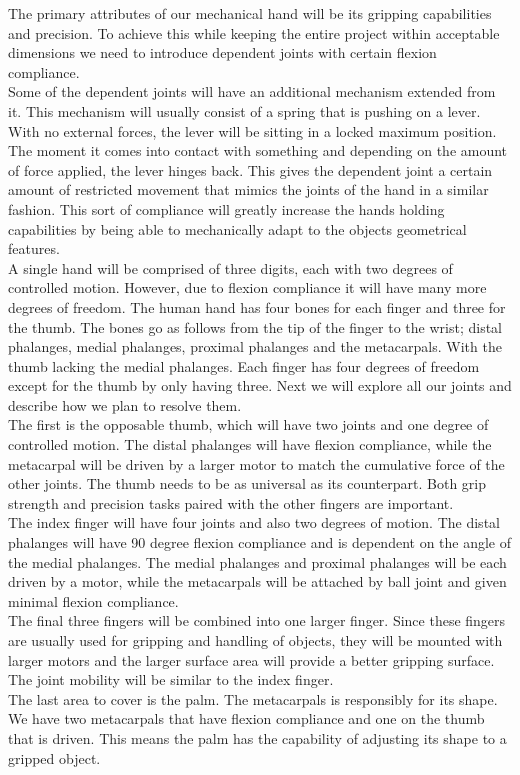 \documentclass{article}
\begin{document}
The primary attributes of our mechanical hand will be its gripping capabilities and precision. To achieve this while keeping the entire project within acceptable dimensions we need to introduce dependent joints with certain flexion compliance. \\[12pt] 
\indent Some of the dependent joints will have an additional mechanism extended from it. This mechanism will usually consist of a spring that is pushing on a lever. With no external forces, the lever will be sitting in a locked maximum position. The moment it comes into contact with something and depending on the amount of force applied, the lever hinges back. This gives the dependent joint a certain amount of restricted movement that mimics the joints of the hand in a similar fashion. This sort of compliance will greatly increase the hands holding capabilities by being able to mechanically adapt to the objects geometrical features. \\[12pt]
\indent A single hand will be comprised of three digits, each with two degrees of controlled motion. However, due to flexion compliance it will have many more degrees of freedom. The human hand has four bones for each finger and three for the thumb. The bones go as follows from the tip of the finger to the wrist; distal phalanges, medial phalanges, proximal phalanges and the metacarpals. With the thumb lacking the medial phalanges. Each finger has four degrees of freedom except for the thumb by only having three. Next we will explore all our joints and describe how we plan to resolve them. \\[12pt]
\indent The first is the opposable thumb, which will have two joints and one degree of controlled motion. The distal phalanges will have flexion compliance, while the metacarpal will be driven by a larger motor to match the cumulative force of the other joints. The thumb needs to be as universal as its counterpart. Both grip strength and precision tasks paired with the other fingers are important. \\[12pt]
\indent The index finger will have four joints and also two degrees of motion. The distal phalanges will have 90 degree flexion compliance and is dependent on the angle of the medial phalanges. The medial phalanges and proximal phalanges will be each driven by a motor, while the metacarpals will be attached by ball joint and given minimal flexion compliance. \\[12pt]
\indent The final three fingers will be combined into one larger finger. Since these fingers are usually used for gripping and handling of objects, they will be mounted with larger motors and the larger surface area will provide a better gripping surface. The joint mobility will be similar to the index finger. \\[12pt]
\indent The last area to cover is the palm. The metacarpals is responsibly for its shape. We have two metacarpals that have flexion compliance and one on the thumb that is driven. This means the palm has the capability of adjusting its shape to a gripped object.
\end{document}
